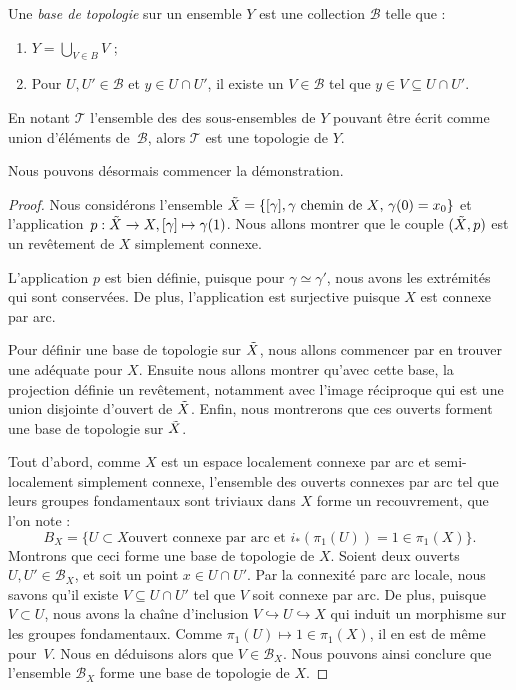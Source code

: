 \begin{definition}
Une \emph{base de topologie} sur un ensemble $Y$ est une collection $\mathcal{B}$ telle que :\begin{enumerate}
    \item $Y=\bigcup_{V\in B}V$ ;
    \item Pour $U,U'\in \mathcal{B}$ et $y\in U\cap U'$, il existe un $V\in\mathcal{B}$ tel que $y\in V\subseteq U\cap U'$.
\end{enumerate}
En notant $\mathcal{T}$ l'ensemble des des sous-ensembles de $Y$ pouvant être écrit comme union d'éléments de~$\mathcal{B}$, alors $\mathcal{T}$ est une topologie de $Y$.
\end{definition}
Nous pouvons désormais commencer la démonstration.
\begin{proof}
Nous considérons l'ensemble $\Tilde{X}=\{[\gamma],\gamma\text{ chemin de $X$, $\gamma(0)=x_0$}\}$ et l'application~${p:\Tilde{X}\to X, [\gamma]\mapsto\gamma(1)}$. Nous allons montrer que le couple $(\Tilde{X},p)$ est un revêtement de $X$ simplement connexe.

L'application $p$ est bien définie, puisque pour $\gamma\simeq\gamma'$, nous avons les extrémités qui sont conservées. De plus, l'application est surjective puisque $X$ est connexe par arc.

\bigskip Pour définir une base de topologie sur $\Tilde{X}$, nous allons commencer par en trouver une adéquate pour $X$. Ensuite nous allons montrer qu'avec cette base, la projection définie un revêtement, notamment avec l'image réciproque qui est une union disjointe d'ouvert de $\Tilde{X}$. Enfin, nous montrerons que ces ouverts forment une base de topologie sur $\Tilde{X}$.

Tout d'abord, comme $X$ est un espace localement connexe par arc et semi-localement simplement connexe, l'ensemble des ouverts connexes par arc tel que leurs groupes fondamentaux sont triviaux dans $X$ forme un recouvrement, que l'on note : \[B_X=\{U\subset X \text{ouvert connexe par arc et } i_\ast(\pi_1(U))=1\in\pi_1(X)\}.\]Montrons que ceci forme une base de topologie de $X$. Soient deux ouverts $U,U'\in\mathcal{B}_X$, et soit un point $x\in U\cap U'$. Par la connexité parc arc locale, nous savons qu'il existe $V\subseteq U\cap U'$ tel que $V$ soit connexe par arc. De plus, puisque $V\subset U$, nous avons la chaîne d'inclusion $V\hookrightarrow U\hookrightarrow X$ qui induit un morphisme sur les groupes fondamentaux. Comme $\pi_1(U)\mapsto 1\in \pi_1(X)$, il en est de même pour~$V$. Nous en déduisons alors que $V\in \mathcal{B}_X$. Nous pouvons ainsi conclure que l'ensemble $\mathcal{B}_X$ forme une base de topologie de $X$.


\end{proof}
